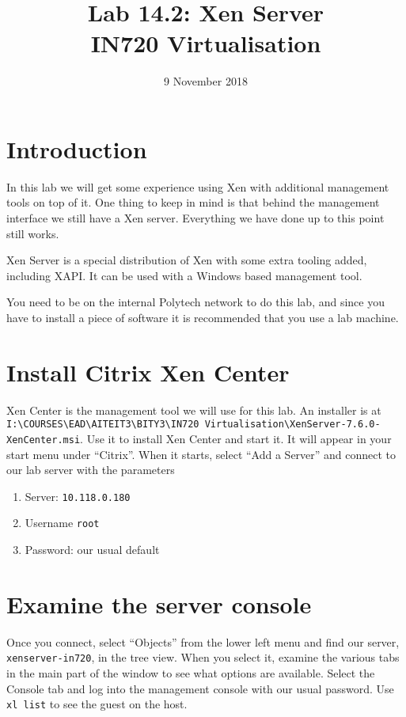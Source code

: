 \documentclass{article}
\begin{document}
\title{Lab 14.2: Xen Server\\ IN720 Virtualisation}
\date{9 November 2018}
\maketitle

\section*{Introduction}
In this lab we will get some experience using Xen with additional management tools on top of it. One thing to keep in mind is that behind the management interface we still have a Xen server. Everything we have done up to this point still works.

Xen Server is a special distribution of Xen with some extra tooling added, including XAPI. It can be used with a Windows 
based management tool. 

You need to be on the internal Polytech network to do this lab, and since you have to install a piece of software it is recommended that you use a lab machine.
 
 \section{Install Citrix Xen Center}
 Xen Center is the management tool we will use for this lab. An installer is at \\
 \texttt{I:{\textbackslash}COURSES{\textbackslash}EAD{\textbackslash}AITEIT3{\textbackslash}BITY3{\textbackslash}IN720 Virtualisation{\textbackslash}XenServer-7.6.0-XenCenter.msi}. Use it to install
 Xen Center and start it. It will appear in your start menu under ``Citrix''. When it starts, select ``Add a Server'' and connect to our lab server with the parameters
 
 \begin{enumerate}
  \item Server: \texttt{10.118.0.180}
  \item Username \texttt{root}
  \item Password: our usual default
  \end{enumerate}
  
  
  
  \section{Examine the server console}
 
 Once you connect, select ``Objects'' from the lower left menu and find our server, \texttt{xenserver-in720}, in the tree 
 view. When you select it, examine the various tabs in the main part of the window to see what options are available. 
 Select the Console tab and log into the management console with our usual password. Use \texttt{xl list} to see the guest on the host.
 
\end{document}
